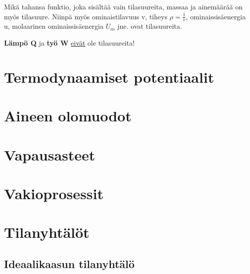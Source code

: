 \documentclass[12pt,a4paper,finnish]{book}
\begin{document}
Mikä tahansa funktio, joka sisältää vain tilasuureita, massaa ja ainemäärää on myös tilasuure. 
Niinpä myös ominaistilavuus v, tiheys $\rho = \frac{1}{v}$, ominaissisäenergia u, molaarinen 
ominaissisäenergia $U_m$ jne. ovat tilasuureita.


\textbf{Lämpö Q} ja \textbf{työ W} \underline{eivät} ole tilasuureita!


\section{Termodynaamiset potentiaalit} %


\section{Aineen olomuodot} %


\section{Vapausasteet} %

\section{Vakioprosessit}%

\section{Tilanyhtälöt}%


\subsection{Ideaalikaasun tilanyhtälö}
\end{document}

